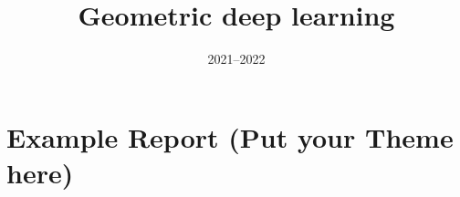 \documentclass{article}
\title{Geometric deep learning}
\date{2021--2022}
\numberwithin{equation}{section}
\begin{document}
    \maketitle
    \tableofcontents
    \clearpage
    \section{Example Report (Put your Theme here)}
    {}
\end{document}
